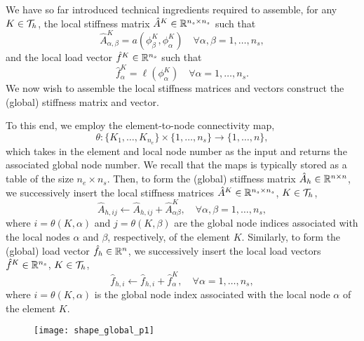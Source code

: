 We have so far introduced technical ingredients required to assemble, for any $K \in \mathcal{T}_h$, the local stiffness matrix $\hat A^K \in \mathbb{R}^{n_s \times n_s}$ such that
\begin{equation*}
  \hat A^K_{\alpha,\beta} = a(\phi^K_\beta,\phi^K_\alpha) \quad \forall \alpha,\beta = 1,\dots,n_s,
\end{equation*}
and the local load vector $\hat f^K \in \mathbb{R}^{n_s}$ such that
\begin{equation*}
  \hat f^K_\alpha = \ell(\phi^K_\alpha) \quad \forall \alpha = 1,\dots,n_s.
\end{equation*}
We now wish to assemble the local stiffness matrices and vectors construct the (global) stiffness matrix and vector.

To this end, we employ the element-to-node connectivity map,
\begin{equation*}
  \theta : \{ K_1, \dots, K_{n_e} \} \times \{ 1, \dots, n_s \} \to \{ 1,\dots,n \},
\end{equation*}
which takes in the element and local node number as the input and returns the associated global node number.  We recall that the maps is typically stored as a table of the size $n_e \times n_s$.  Then, to form the (global) stiffness matrix $\hat A_h \in \mathbb{R}^{n \times n}$, we successively insert the local stiffness matrices $\hat A^K \in \mathbb{R}^{n_s \times n_s}$, $K \in \mathcal{T}_h$, 
\begin{equation*}
  \hat A_{h,ij} \leftarrow \hat A_{h,ij} + \hat A^K_{\alpha\beta}, \quad \forall \alpha,\beta = 1,\dots,n_s,
\end{equation*}
where $i = \theta(K,\alpha)$ and $j = \theta(K,\beta)$ are the global node indices associated with the local nodes $\alpha$ and $\beta$, respectively, of the element $K$. Similarly, to form the (global) load vector $\hat f_h \in \mathbb{R}^n$, we successively insert the local load vectors $\hat f^K \in \mathbb{R}^{n_s}$, $K \in \mathcal{T}_h$,
\begin{equation*}
  \hat f_{h,i} \leftarrow \hat f_{h,i} + \hat f^K_{\alpha}, \quad \forall \alpha = 1,\dots,n_s,
\end{equation*}
where $i = \theta(K,\alpha)$ is the global node index associated with the local node $\alpha$ of the element $K$.


\begin{figure}
  \centering
  \texttt{[image: shape\_global\_p1]}
\end{figure}




